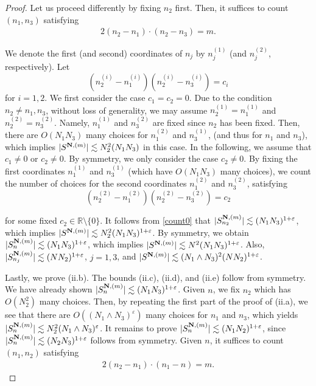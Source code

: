 \documentclass[%
11pt,  reqno]{amsart}
\newcommand{\1}{\hspace{0.2mm}\text{I}\hspace{0.2mm}}
\newcommand{\noi}{\noindent}
\newcommand{\R}{\mathbb{R}}
\newcommand{\eps}{\varepsilon}
\newcommand{\les}{\lesssim}
\numberwithin{equation}{section}
\numberwithin{theorem}{section}
\begin{document}
\begin{proof}
Let us proceed differently by fixing
 $n_2$ first.
Then,
it suffices to count
$(n_1, n_3)$ satisfying
\begin{align*}
2(n_2-n_1)\cdot (n_2-n_3) = m.
\end{align*}

\noi
We denote the first (and second) coordinates
of $n_j$ by $n_j^{(1)}$  (and $n_j^{(2)}$, respectively).
Let
\[
(n_2^{(i)}- n_1^{(i)}) (n_2^{(i)} - n_3^{(i)}) = c_i
\]
for $i = 1,2$.
We first consider the case $c_1 = c_2 = 0$.
Due to the condition $n_2 \neq n_1, n_3$, without loss of generality, we may assume $n_2^{(1)} = n_1^{(1)}$ and $n_2^{(2)} = n_3^{(2)}$. Namely,  $n_1^{(1)}$ and $n_3^{(2)}$ are fixed 
since $n_2$ has been fixed.
Then,  there are $O(N_1N_3)$ many choices 
for $n_1^{(2)}$ and $n_3^{(1)}$,
(and thus for  $n_1$ and $n_3$), 
 which implies $|S^{{\bf N}, (m)}| \les N_2^2 (N_1N_3)$ in this case.
In the following, we assume that $c_1 \neq 0$ or $c_2 \neq 0$.
By symmetry, we only consider the case $c_2 \neq 0$.
By fixing the first coordinates $n_1^{(1)}$ and $n_3^{(1)}$ 
(which have $O(N_1N_3)$ many choices),
we count the number of choices for the second coordinates
$n_1^{(2)}$ and $n_3^{(2)}$,  satisfying
\[
(n_2^{(2)}- n_1^{(2)}) (n_2^{(2)} - n_3^{(2)})
= c_2\]

\noi
for some fixed $c_2 \in \R \setminus\{0\}$.
It follows from \eqref{count0}
that
 $|S^{{\bf N}, (m)}_{n_2}| \les  (N_1N_3)^{1+\eps}$,
which implies $|S^{{\bf N}, (m)}| \les N_2^2 (N_1N_3)^{1+\eps}$.
By symmetry, we obtain
 $|S^{{\bf N}, (m)}_{n}| \les  (N_1N_3)^{1+\eps}$,
which implies $|S^{{\bf N}, (m)}| \les N^2 (N_1N_3)^{1+\eps}$. 
Also, 
 $|S^{{\bf N}, (m)}_{n_j}| \les  (NN_2)^{1+\eps}$, $j = 1, 3$, 
 and 
$|S^{{\bf N}, (m)}| \les (N_1\wedge N_3)^2 (NN_2)^{1+\eps}$. 



Lastly, we prove (ii.b).
The bounds (ii.c), (ii.d), and (ii.e) follow from symmetry.
We have already shown  $|S^{{\bf N}, (m)}_{n}| \les  (N_1N_3)^{1+\eps}$.
Given $n$, 
we fix  $n_2$ which has $O(N_2^2)$ many choices.
Then, %
by repeating the first part of the proof of (ii.a), 
we see that there are $O((N_1\wedge N_3)^\eps)$ many choices
for $n_1$ and $n_3$, 
which yields
$|S^{{\bf N}, (m)}_{n}|\les N_2^2 (N_1\wedge N_3)^{\eps}$.
It remains to prove
$|S^{{\bf N}, (m)}_{n}| \les(N_1N_2)^{1+\eps}$, since $|S^{{\bf N}, (m)}_{n}| \les (N_2 N_3)^{1+\eps}$
follows from symmetry.
Given $n$, 
it suffices to count
$(n_1, n_2)$ satisfying
\begin{align}
2(n_2-n_1)\cdot (n_1-n) = m.
\label{count3}
\end{align}


\end{proof}
\end{document}
